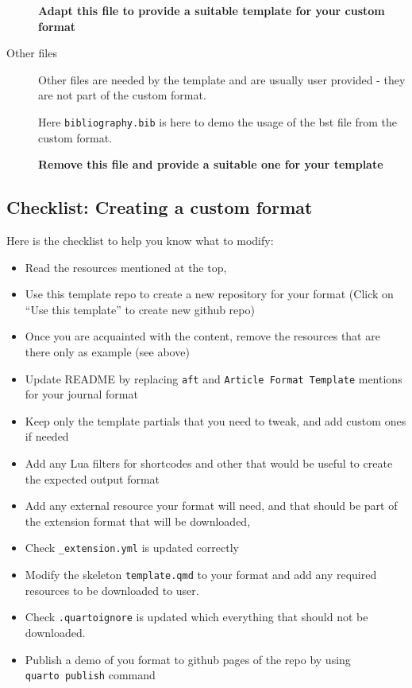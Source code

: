 \documentclass[
]{aft}
\providecommand{\tightlist}{%
  \setlength{\itemsep}{0pt}\setlength{\parskip}{0pt}}\usepackage{longtable,booktabs,array}
\begin{document}
\begin{description}
\textbf{Adapt this file to provide a suitable template for your custom
format}
\item[Other files]
Other files are needed by the template and are usually user provided -
they are not part of the custom format.

Here \texttt{bibliography.bib} is here to demo the usage of the bst file
from the custom format.

\textbf{Remove this file and provide a suitable one for your template}
\end{description}

\newpage{}

\subsection{Checklist: Creating a custom
format}\label{checklist-creating-a-custom-format}

Here is the checklist to help you know what to modify:

\begin{itemize}
\tightlist
\item
  Read the resources mentioned at the top,
\item
  Use this template repo to create a new repository for your format
  (Click on ``Use this template'' to create new github repo)
\item
  Once you are acquainted with the content, remove the resources that
  are there only as example (see above)
\item
  Update README by replacing \texttt{aft} and
  \texttt{Article\ Format\ Template} mentions for your journal format
\item
  Keep only the template partials that you need to tweak, and add custom
  ones if needed
\item
  Add any Lua filters for shortcodes and other that would be useful to
  create the expected output format
\item
  Add any external resource your format will need, and that should be
  part of the extension format that will be downloaded,
\item
  Check \texttt{\_extension.yml} is updated correctly
\item
  Modify the skeleton \texttt{template.qmd} to your format and add any
  required resources to be downloaded to user.
\item
  Check \texttt{.quartoignore} is updated which everything that should
  not be downloaded.
\item
  Publish a demo of you format to github pages of the repo by using
  \texttt{quarto\ publish} command
\end{itemize}
\end{document}
